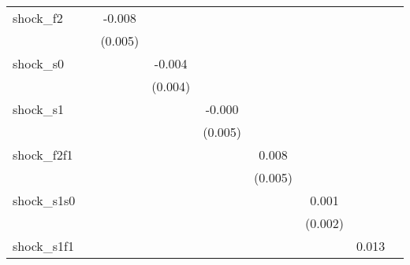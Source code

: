 {\begin{tabular}{l*{8}{c}}
\addlinespace
shock\_f2    &                     &      -0.008         &                     &                     &                     &                     &                     &                     \\
            &                     &     (0.005)         &                     &                     &                     &                     &                     &                     \\
\addlinespace
shock\_s0    &                     &                     &      -0.004         &                     &                     &                     &                     &                     \\
            &                     &                     &     (0.004)         &                     &                     &                     &                     &                     \\
\addlinespace
shock\_s1    &                     &                     &                     &      -0.000         &                     &                     &                     &                     \\
            &                     &                     &                     &     (0.005)         &                     &                     &                     &                     \\
\addlinespace
shock\_f2f1  &                     &                     &                     &                     &       0.008         &                     &                     &                     \\
            &                     &                     &                     &                     &     (0.005)         &                     &                     &                     \\
\addlinespace
shock\_s1s0  &                     &                     &                     &                     &                     &       0.001         &                     &                     \\
            &                     &                     &                     &                     &                     &     (0.002)         &                     &                     \\
\addlinespace
shock\_s1f1  &                     &                     &                     &                     &                     &                     &       0.013\sym{*}  &                     \\

\end{tabular}}
